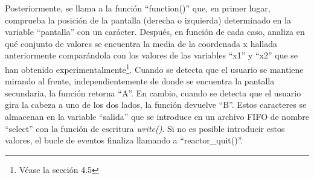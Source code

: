 Posteriormente, se llama a la función ``function()'' que, en primer lugar, comprueba la posición de la pantalla (derecha o izquierda) determinado en la variable ``pantalla'' con un carácter. Después, en función de cada caso, analiza en qué conjunto de valores se encuentra la media de la coordenada x hallada anteriormente comparándola con los valores de las variables ``x1'' y ``x2'' que se han obtenido experimentalmente\footnote{Véase la sección 4.5}. Cuando se detecta que el usuario se mantiene mirando al frente, independientemente de donde se encuentra la pantalla secundaria, la función retorna ``A''. En cambio, cuando se detecta que el usuario gira la cabeza a uno de los dos lados, la función devuelve ``B''. Estos caracteres se almacenan en la variable ``salida'' que se introduce en un archivo FIFO de nombre ``select'' con la función de escritura {\itshape write()}. Si no es posible introducir estos valores, el bucle de eventos finaliza llamando a ``reactor\_quit()''.


